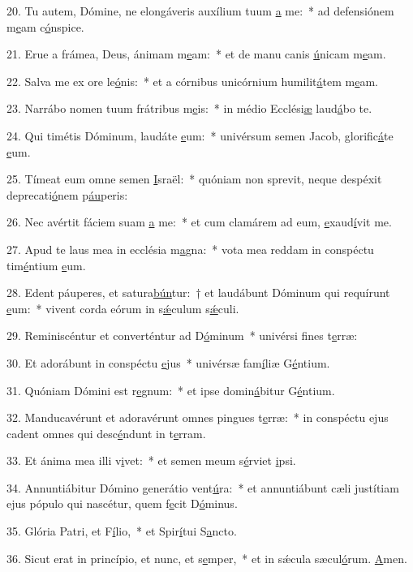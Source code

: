 20. Tu autem, Dómine, ne elongáveris auxílium tuum \uline{a} me:~* ad defensiónem m\uline{e}am c\uline{ó}nspice.\par 
21. Erue a frámea, Deus, ánimam m\uline{e}am:~* et de manu canis \uline{ú}nicam m\uline{e}am.\par 
22. Salva me ex ore le\uline{ó}nis:~* et a córnibus unicórnium humilit\uline{á}tem m\uline{e}am.\par 
23. Narrábo nomen tuum frátribus m\uline{e}is:~* in médio Ecclési\uline{æ} laud\uline{á}bo te.\par 
24. Qui timétis Dóminum, laudáte \uline{e}um:~* univérsum semen Jacob, glorific\uline{á}te \uline{e}um.\par 
25. Tímeat eum omne semen \uline{I}sraël:~* quóniam non sprevit, neque despéxit deprecati\uline{ó}nem p\uline{áu}peris:\par 
26. Nec avértit fáciem suam \uline{a} me:~* et cum clamárem ad eum, \uline{e}xaud\uline{í}vit me.\par 
27. Apud te laus mea in ecclésia m\uline{a}gna:~* vota mea reddam in conspéctu tim\uline{é}ntium \uline{e}um.\par 
28. Edent páuperes, et satura\uline{bún}tur:~† et laudábunt Dóminum qui requírunt \uline{e}um:~* vivent corda eórum in s\uline{ǽ}culum s\uline{ǽ}culi.\par 
29. Reminiscéntur et converténtur ad D\uline{ó}minum~* univérsi f\uline{i}nes t\uline{e}rræ:\par 
30. Et adorábunt in conspéctu \uline{e}jus~* univérsæ fam\uline{í}liæ G\uline{é}ntium.\par 
31. Quóniam Dómini est r\uline{e}gnum:~* et ipse domin\uline{á}bitur G\uline{é}ntium.\par 
32. Manducavérunt et adoravérunt omnes pingues t\uline{e}rræ:~* in conspéctu ejus cadent omnes qui desc\uline{é}ndunt in t\uline{e}rram.\par 
33. Et ánima mea illi v\uline{i}vet:~* et semen meum s\uline{é}rviet \uline{i}psi.\par 
34. Annuntiábitur Dómino generátio vent\uline{ú}ra:~* et annuntiábunt cæli justítiam ejus pópulo qui nascétur, quem f\uline{e}cit D\uline{ó}minus.\par 
35. Glória Patri, et F\uline{í}lio,~* et Spir\uline{í}tui S\uline{a}ncto.\par 
36. Sicut erat in princípio, et nunc, et s\uline{e}mper,~* et in sǽcula sæcul\uline{ó}rum. \uline{A}men.\par 
